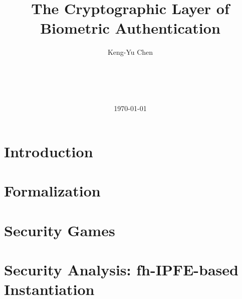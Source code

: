 







\title{\textbf{The Cryptographic Layer of Biometric Authentication}}
\author{Keng-Yu Chen \\
   \\
  \\
  \\
  \\
}
\date{\today}

\maketitle


\pagestyle{fancy}
\fancyhf{}
\fancyfoot[C]{\thepage}



\section{Introduction}
\label{sec:introdiction}


\section{Formalization}
\label{sec:formalization}


\section{Security Games}
\label{sec:security_game}


\section{Security Analysis: fh-IPFE-based Instantiation}
\label{sec:security_analysis:fh-IPFE}


